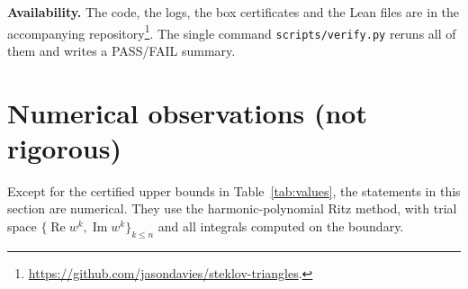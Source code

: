 \documentclass[11pt]{article}
\theoremstyle{definition}
\theoremstyle{remark}
\renewcommand{\Re}{\operatorname{Re}}
\renewcommand{\Im}{\operatorname{Im}}
\begin{document}
\textbf{Availability.} The code, the logs, the box certificates and the Lean files are in the accompanying
repository\footnote{\url{https://github.com/jasondavies/steklov-triangles}.}. The single command \texttt{scripts/verify.py} reruns all of them and writes a PASS/FAIL
summary.

\section{Numerical observations (not rigorous)}\label{sec:numerics}

Except for the certified upper bounds in Table~\ref{tab:values}, the statements in this section are
numerical. They use the harmonic-polynomial Ritz method, with trial space $\{\Re w^k,\Im w^k\}_{k\le n}$ and
all integrals computed on the boundary.
\end{document}
